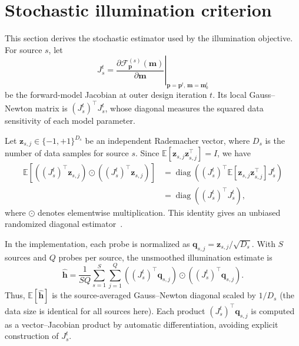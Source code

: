 \documentclass{article}
\newcommand{\vect}[1]{\boldsymbol{#1}}
\begin{document}
\newpage


\clearpage
\appendix
\makeatletter
\setlength{\@fptop}{0pt}
\makeatother
\section{Stochastic illumination criterion}
\label{app:illumination-derivation}

This section derives the stochastic estimator used by the illumination
objective. For source $s$, let
\begin{equation}
  J_s^t
  = \left.
    \frac{\partial \mathcal{F}_{\vect{p}}^{(s)}(\vect{m})}
         {\partial \vect{m}}
    \right|_{\vect{p}=\vect{p}^t,\,\vect{m}=\vect{m}_0^t}
\end{equation}
be the forward-model Jacobian at outer design iteration $t$. Its local
Gauss--Newton matrix is $(J_s^t)^\top J_s^t$, whose diagonal measures the
squared data sensitivity of each model parameter.

Let $\vect{z}_{s,j}\in\{-1,+1\}^{D_s}$ be an independent Rademacher vector,
where $D_s$ is the number of data samples for source $s$. Since
$\mathbb{E}[\vect{z}_{s,j}\vect{z}_{s,j}^\top]=I$, we have
\begin{align}
  \mathbb{E}\!\left[
    ((J_s^t)^\top\vect{z}_{s,j})
    \odot
    ((J_s^t)^\top\vect{z}_{s,j})
  \right]
  &= \operatorname{diag}\!\left(
       (J_s^t)^\top
       \mathbb{E}[\vect{z}_{s,j}\vect{z}_{s,j}^\top]
       J_s^t
     \right) \\
  &= \operatorname{diag}\!\left((J_s^t)^\top J_s^t\right),
  \label{eq:illumination-expectation}
\end{align}
where $\odot$ denotes elementwise multiplication. This identity gives an
unbiased randomized diagonal estimator~\citep{bekas2007diagonal}.

In the implementation, each probe is normalized as
$\vect{q}_{s,j}=\vect{z}_{s,j}/\sqrt{D_s}$. With $S$ sources and $Q$ probes per
source, the unsmoothed illumination estimate is
\begin{equation}
  \widehat{\vect{h}}
  = \frac{1}{SQ}\sum_{s=1}^{S}\sum_{j=1}^{Q}
    ((J_s^t)^\top\vect{q}_{s,j})
    \odot
    ((J_s^t)^\top\vect{q}_{s,j}).
  \label{eq:illumination}
\end{equation}
Thus, $\mathbb{E}[\widehat{\vect{h}}]$ is the source-averaged Gauss--Newton
diagonal scaled by $1/D_s$ (the data size is identical for all sources here).
Each product $(J_s^t)^\top\vect{q}_{s,j}$ is computed as a
vector--Jacobian product by automatic differentiation, avoiding explicit
construction of $J_s^t$.
\end{document}

